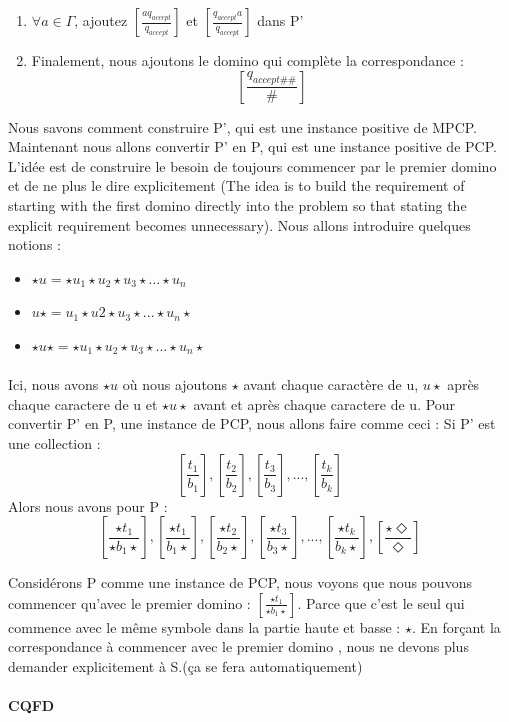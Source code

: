 \begin{enumerate}
        \item $\forall a \in \Gamma$, ajoutez $[\frac{aq_{accept}}{q_{accept}}]$ et $[\frac{q_{accept}a}{q_{accept}}]$ dans P'
        
        \item Finalement, nous ajoutons le domino qui complète la correspondance : \[[\frac{q_{accept\#\#}}{\#}]\]
\end{enumerate}

Nous savons comment construire P', qui est une instance positive de MPCP. Maintenant nous allons convertir P' en P, qui est une instance positive de PCP. L'idée est de construire le besoin de toujours commencer par le premier domino et de ne plus le dire explicitement (The idea is to build the requirement of starting with the first domino directly into the problem so that stating the explicit requirement becomes unnecessary). Nous allons introduire quelques notions :
\begin{itemize}
\item $\star u = \star u_1 \star u_2 \star u_3 \star ... \star u_n$
\item $u \star = u_1 \star u2 \star u_3 \star ... \star u_n \star$
\item $ \star u \star = \star u_1 \star u_2 \star u_3  \star ... \star u_n \star$
\end{itemize}
\paragraph{}
Ici, nous avons $\star u$ où nous ajoutons $\star$ avant chaque caractère de u, $u \star$ après chaque caractere de u et $\star u \star$
avant et après chaque caractere de u. Pour convertir P' en P, une instance de PCP, nous allons faire comme ceci : Si P' est une collection : 
\[ [\frac{t_1}{b_1}], [\frac{t_2}{b_2}], [\frac{t_3}{b_3}], ..., [\frac{t_k}{b_k}] \]
Alors nous avons pour P :
\[ [\frac{\star t_1}{\star b_1 \star }], [\frac{\star t_1}{b_1 \star }], [\frac{\star t_2}{b_2 \star }], [\frac{\star t_3}{b_3 \star }], ..., [\frac{\star t_k}{b_k \star }], [\frac{\star \Diamond}{\Diamond}] \]

Considérons P comme une instance de PCP, nous voyons que nous pouvons commencer qu'avec le premier domino : $[\frac{\star t_1}{\star b_1 \star }]$. Parce que c'est le seul qui commence avec le même symbole dans la partie haute et basse : $\star$. En forçant la correspondance à commencer avec le premier domino , nous ne devons plus demander explicitement à S.(ça se fera automatiquement) 
\paragraph{}
\textbf{CQFD}


